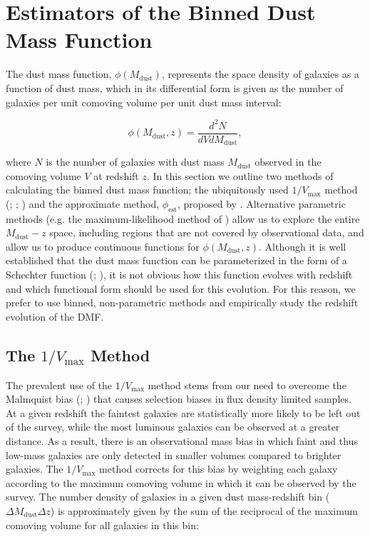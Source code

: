 \section{Estimators of the Binned Dust Mass Function}
\label{sec:dmf_estimators}

The dust mass function, $\phi(M_{\textrm{dust}})$, represents the space density of galaxies as a function of dust mass, which in its differential form is given as the number of galaxies per unit comoving volume per unit dust mass interval:

\begin{equation}
    \phi(M_{\textrm{dust}}, z) = \frac{d^2N}{dV dM_{\textrm{dust}}},
\label{eq:differential_phi}
\end{equation}

\noindent where $N$ is the number of galaxies with dust mass $M_{\textrm{dust}}$ observed in the comoving volume $V$ at redshift $z$. In this section we outline two methods of calculating the binned dust mass function; the ubiquitously used $1/V_{\textrm{max}}$ method (\citealt{Schmidt_1968}; \citealt{Felten_1976}; \citealt{Avni_1980}) and the approximate method, $\phi_{\textrm{est}}$, proposed by \citealt{Page_2000}. Alternative parametric methods (e.g. the maximum-likelihood method of \citealt{Marshall_1983}) allow us to explore the entire $M_{\textrm{dust}} - z$ space, including regions that are not covered by observational data, and allow us to produce continuous functions for $\phi(M_{\textrm{dust}}, z)$. Although it is well established that the dust mass function can be parameterized in the form of a Schechter function (\citealt{Press_1974}; \citealt{Schechter_1976}), it is not obvious how this function evolves with redshift and which functional form should be used for this evolution. For this reason, we prefer to use binned, non-parametric methods and empirically study the redshift evolution of the DMF.

\subsection{The $1/V_{\textrm{max}}$ Method}

The prevalent use of the $1/V_{\textrm{max}}$ method stems from our need to overcome the Malmquist bias (\citealt{Eddington_1914}; \citealt{Malmquist_1922}) that causes selection biases in flux density limited samples. At a given redshift the faintest galaxies are statistically more likely to be left out of the survey, while the most luminous galaxies can be observed at a greater distance. As a result, there is an observational mass bias in which faint and thus low-mass galaxies are only detected in smaller volumes compared to brighter galaxies. The $1/V_{\textrm{max}}$ method corrects for this bias by weighting each galaxy according to the maximum comoving volume in which it can be observed by the survey. The number density of galaxies in a given dust mass-redshift bin ($\Delta M_{\textrm{dust}} \Delta z$) is approximately given by the sum of the reciprocal of the maximum comoving volume for all galaxies in this bin:

